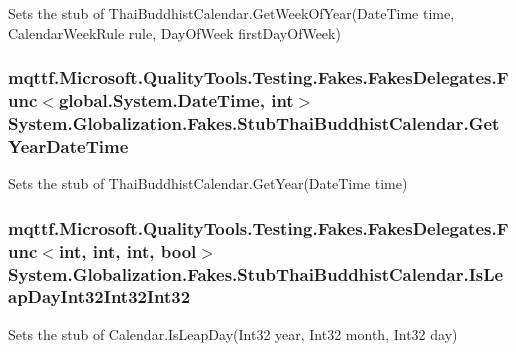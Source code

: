 Sets the stub of Thai\-Buddhist\-Calendar.\-Get\-Week\-Of\-Year(\-Date\-Time time, Calendar\-Week\-Rule rule, Day\-Of\-Week first\-Day\-Of\-Week)

\hypertarget{class_system_1_1_globalization_1_1_fakes_1_1_stub_thai_buddhist_calendar_a299542d817be4fa85c999e4bde09050b}{
\subsubsection[{Get\-Year\-Date\-Time}]{\setlength{\rightskip}{0pt plus 5cm}mqttf.\-Microsoft.\-Quality\-Tools.\-Testing.\-Fakes.\-Fakes\-Delegates.\-Func$<$global.\-System.\-Date\-Time, int$>$ System.\-Globalization.\-Fakes.\-Stub\-Thai\-Buddhist\-Calendar.\-Get\-Year\-Date\-Time}}\label{class_system_1_1_globalization_1_1_fakes_1_1_stub_thai_buddhist_calendar_a299542d817be4fa85c999e4bde09050b}


Sets the stub of Thai\-Buddhist\-Calendar.\-Get\-Year(\-Date\-Time time)

\hypertarget{class_system_1_1_globalization_1_1_fakes_1_1_stub_thai_buddhist_calendar_a0e4564325d91216d018a1f7267d7e3b5}{
\subsubsection[{Is\-Leap\-Day\-Int32\-Int32\-Int32}]{\setlength{\rightskip}{0pt plus 5cm}mqttf.\-Microsoft.\-Quality\-Tools.\-Testing.\-Fakes.\-Fakes\-Delegates.\-Func$<$int, int, int, bool$>$ System.\-Globalization.\-Fakes.\-Stub\-Thai\-Buddhist\-Calendar.\-Is\-Leap\-Day\-Int32\-Int32\-Int32}}\label{class_system_1_1_globalization_1_1_fakes_1_1_stub_thai_buddhist_calendar_a0e4564325d91216d018a1f7267d7e3b5}


Sets the stub of Calendar.\-Is\-Leap\-Day(\-Int32 year, Int32 month, Int32 day)

